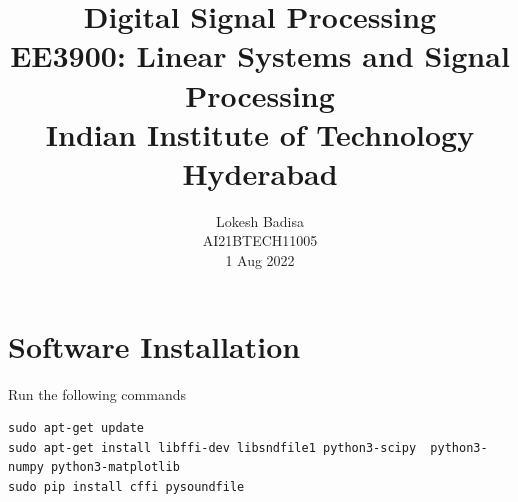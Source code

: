 \documentclass[journal,12pt,twocolumn]{IEEEtran}
\numberwithin{equation}{section}
\begin{document}
                             
\title{ Digital Signal Processing \\ \Large EE3900: Linear Systems and Signal Processing \\ \large Indian Institute of Technology Hyderabad}
\author{Lokesh Badisa \\ \normalsize AI21BTECH11005 \\ \vspace*{20pt} \normalsize 1 Aug 2022}   
 \maketitle 
 \tableofcontents
\section{Software Installation}
Run the following commands
\begin{lstlisting}
sudo apt-get update
sudo apt-get install libffi-dev libsndfile1 python3-scipy  python3-numpy python3-matplotlib 
sudo pip install cffi pysoundfile 
\end{lstlisting}
\end{document}
